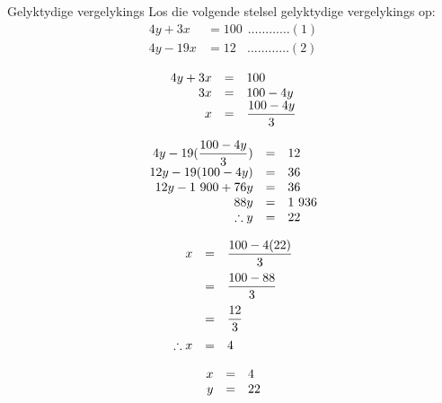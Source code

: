 \begin{wex}
{Gelyktydige vergelykings}
{
Los die volgende stelsel gelyktydige vergelykings op:
\begin{equation*}
\begin{array}{ccc}
  4y+3x &= 100  ~~\ldots \ldots \ldots \ldots (1) \\
  4y - 19x &= 12 ~~~~\ldots \ldots \ldots \ldots (2)
\end{array}
\end{equation*}
}
{
\begin{equation*}
    \begin{array}{ccl}\hfill 4y+3x & =& 100\hfill \\
\hfill 3x &=& 100 - 4y \hfill \\
\hfill x& =& \dfrac{100 - 4y}{3} \hfill
    \end{array}
\end{equation*}


\begin{equation*}
    \begin{array}{ccl}\hfill 4y - 19(\dfrac{100 - 4y}{3})& =& 12\hfill \\
	\hfill 12y - 19(100 - 4y)  & =& 36\hfill \\
	\hfill 12y - 1~900 + 76y & =& 36 \hfill \\
\hfill  88y& =& 1~936 \hfill \\
\hfill \therefore y& =& 22 \hfill
    \end{array}
\end{equation*}

\begin{equation*}
    \begin{array}{ccl}\hfill x &=& \dfrac{100 - 4(22)}{3}\hfill \vspace{6pt}\\
	\hfill & =& \dfrac{100-88}{3}\hfill \vspace{6pt}\\
	\hfill & =& \dfrac{12}{3}\hfill\vspace{6pt} \\
	\hfill \therefore x&=& 4 \hfill 
    \end{array}
\end{equation*}


\begin{equation*}
\begin{array}{ccc}
 \hfill x& =& 4\hfill \\
\hfill y& =& 22\hfill 
\end{array}
\end{equation*}
}
\end{wex}
\clearpage
